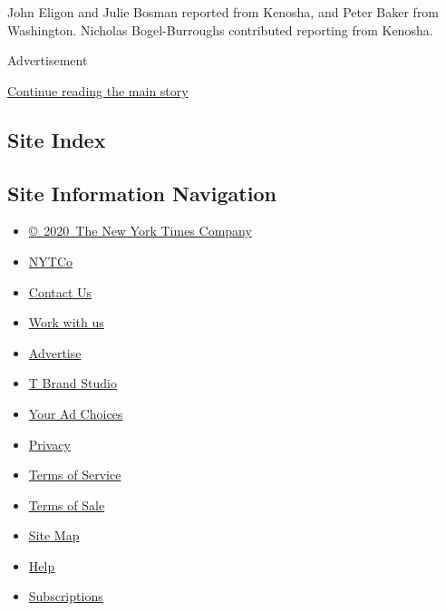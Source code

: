 John Eligon and Julie Bosman reported from Kenosha, and Peter Baker from
Washington. Nicholas Bogel-Burroughs contributed reporting from Kenosha.

Advertisement

\protect\hyperlink{after-bottom}{Continue reading the main story}

\hypertarget{site-index}{%
\subsection{Site Index}\label{site-index}}

\hypertarget{site-information-navigation}{%
\subsection{Site Information
Navigation}\label{site-information-navigation}}

\begin{itemize}
\tightlist
\item
  \href{https://help.nytimes3xbfgragh.onion/hc/en-us/articles/115014792127-Copyright-notice}{©~2020~The
  New York Times Company}
\end{itemize}

\begin{itemize}
\tightlist
\item
  \href{https://www.nytco.com/}{NYTCo}
\item
  \href{https://help.nytimes3xbfgragh.onion/hc/en-us/articles/115015385887-Contact-Us}{Contact
  Us}
\item
  \href{https://www.nytco.com/careers/}{Work with us}
\item
  \href{https://nytmediakit.com/}{Advertise}
\item
  \href{http://www.tbrandstudio.com/}{T Brand Studio}
\item
  \href{https://www.nytimes3xbfgragh.onion/privacy/cookie-policy\#how-do-i-manage-trackers}{Your
  Ad Choices}
\item
  \href{https://www.nytimes3xbfgragh.onion/privacy}{Privacy}
\item
  \href{https://help.nytimes3xbfgragh.onion/hc/en-us/articles/115014893428-Terms-of-service}{Terms
  of Service}
\item
  \href{https://help.nytimes3xbfgragh.onion/hc/en-us/articles/115014893968-Terms-of-sale}{Terms
  of Sale}
\item
  \href{https://spiderbites.nytimes3xbfgragh.onion}{Site Map}
\item
  \href{https://help.nytimes3xbfgragh.onion/hc/en-us}{Help}
\item
  \href{https://www.nytimes3xbfgragh.onion/subscription?campaignId=37WXW}{Subscriptions}
\end{itemize}
